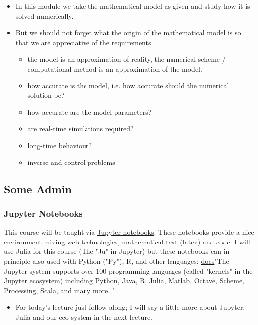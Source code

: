 \documentclass[12pt,landscape]{article}
\begin{document}
{\begin{itemize}
\item In this module we take the mathematical model as given and study how it is solved numerically.


\item But we should not forget what the origin of the mathematical model is so that we are appreciative of the requirements. 

\begin{itemize}
\item the model is an approximation of reality, the numerical scheme / computational method is an approximation of the model.


\item how accurate is the model, i.e. how accurate should the numerical solution be? 


\item how accurate are the model parameters? 


\item are real-time simulations required?


\item long-time behaviour? 


\item inverse and control problems

\end{itemize}
\end{itemize}
\subsection{Some Admin}
\subsubsection{Jupyter Notebooks}
This course will be taught via \href{https://jupyter.org}{Jupyter notebooks}. These notebooks provide a nice environment mixing web technologies, mathematical text (latex) and code. I will use Julia for this course (The "Ju" in Jupyter) but these notebooks can in principle also used with Python ("Py"), R, and other languages:  \href{https://jupyter4edu.github.io/jupyter-edu-book/jupyter.html#language-support-kernels}{docs}"The Jupyter system supports over 100 programming languages (called "kernels" in the Jupyter ecosystem) including Python, Java, R, Julia, Matlab, Octave, Scheme, Processing, Scala, and many more. "

\begin{itemize}
\item For today's lecture just follow along; I will say a little more about Jupyter, Julia and our eco-system in the next lecture.



\end{itemize}}
\end{document}

